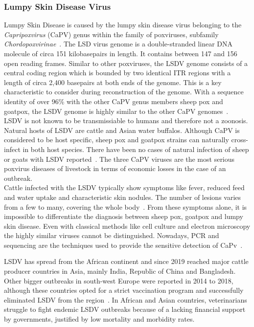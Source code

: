 \subsubsection*{Lumpy Skin Disease Virus}
Lumpy Skin Disease is caused by the lumpy skin disease virus belonging to the \textit{Capripoxvirus} (CaPV) genus within the family of poxviruses, subfamily \textit{Chordopoxvirinae}~\cite{walker2019changes}. The LSD virus genome is a double-stranded linear DNA molecule of circa 151 kilobasepairs in length. It contains between 147 and 156 open reading frames. Similar to other poxviruses, the LSDV genome consists of a central coding region which is bounded by two identical ITR regions with a length of circa 2,400 basepairs at both ends of the genome. This is a key characteristic to consider during reconstruction of the genome. With a sequence identity of over 96\% with the other CaPV genus members sheep pox and goatpox, the LSDV genome is highly similar to the other CaPV genomes~\cite{tulman2001genome}. \\
LSDV is not known to be transmissiable to humans and therefore not a zoonosis. Natural hosts of LSDV are cattle and Asian water buffalos. Although CaPV is considered to be host specific, sheep pox and goatpox strains can naturally cross-infect in both host species. There have been no cases of natural infection of sheep or goats with LSDV reported~\cite{namazi2021lumpy}. The three CaPV viruses are the most serious poxvirus diseases of livestock in terms of economic losses in the case of an outbreak. \\
Cattle infected with the LSDV typically show symptoms like fever, reduced feed and water uptake and characteristic skin nodules. The number of lesions varies from a few to many, covering the whole body~\cite{prozesky1982study}. From these symptoms alone, it is impossible to differentiate the diagnosis between sheep pox, goatpox and lumpy skin disease. Even with classical methods like cell culture and electron microscopy the highly similar viruses cannot be distinguished. Nowadays, PCR and sequencing are the techniques used to provide the sensitive detection of CaPv~\cite{lafar2020capripoxvirus}.

LSDV has spread from the African continent and since 2019 reached major cattle producer countries in Asia, mainly India, Republic of China and Bangladesh. Other bigger outbreaks in south-west Europe were reported in 2014 to 2018, although these countries opted for a strict vaccination program and successfully eliminated LSDV from the region~\cite{prevention2017control}. In African and Asian countries, veterinarians struggle to fight endemic LSDV outbreaks because of a lacking financial support by governments, justified by low mortality and morbidity rates.

